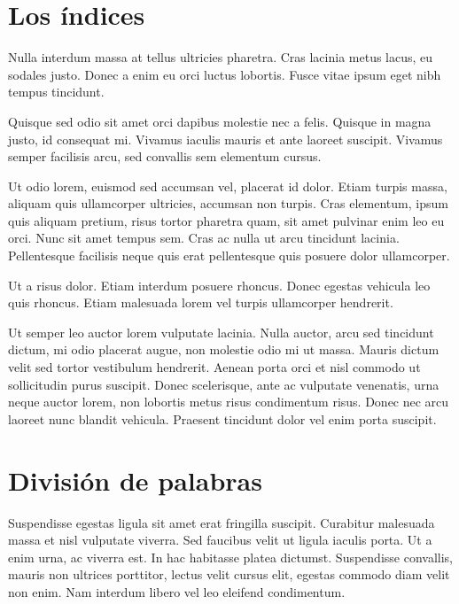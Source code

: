 \documentclass[12pt,a4paper]{report}
\begin{document}
\section{Los índices}
\label{seccion.indice}



Nulla interdum massa at tellus ultricies pharetra. Cras lacinia metus lacus, eu sodales justo. Donec a enim eu orci luctus lobortis. Fusce vitae ipsum eget nibh tempus tincidunt.

Quisque sed odio sit amet orci dapibus molestie nec a felis. Quisque in magna justo, id consequat mi. Vivamus iaculis mauris et ante laoreet suscipit. Vivamus semper facilisis arcu, sed convallis sem elementum cursus. 

Ut odio lorem, euismod sed accumsan vel, placerat id dolor. Etiam turpis massa, aliquam quis ullamcorper ultricies, accumsan non turpis. Cras elementum, ipsum quis aliquam pretium, risus tortor pharetra quam, sit amet pulvinar enim leo eu orci. Nunc sit amet tempus sem. Cras ac nulla ut arcu tincidunt lacinia. Pellentesque facilisis neque quis erat pellentesque quis posuere dolor ullamcorper. 

Ut a risus dolor. Etiam interdum posuere rhoncus. Donec egestas vehicula leo quis rhoncus. Etiam malesuada lorem vel turpis ullamcorper hendrerit.

Ut semper leo auctor lorem vulputate lacinia. Nulla auctor, arcu sed tincidunt dictum, mi odio placerat augue, non molestie odio mi ut massa. Mauris dictum velit sed tortor vestibulum hendrerit. Aenean porta orci et nisl commodo ut sollicitudin purus suscipit. Donec scelerisque, ante ac vulputate venenatis, urna neque auctor lorem, non lobortis metus risus condimentum risus. Donec nec arcu laoreet nunc blandit vehicula. Praesent tincidunt dolor vel enim porta suscipit. 





\section{División de palabras}
\label{seccion.division}



Suspendisse egestas ligula sit amet erat fringilla suscipit. Curabitur malesuada massa et nisl vulputate viverra. Sed faucibus velit ut ligula iaculis porta. Ut a enim urna, ac viverra est. In hac habitasse platea dictumst. Suspendisse convallis, mauris non ultrices porttitor, lectus velit cursus elit, egestas commodo diam velit non enim. Nam interdum libero vel leo eleifend condimentum. 
\end{document}
